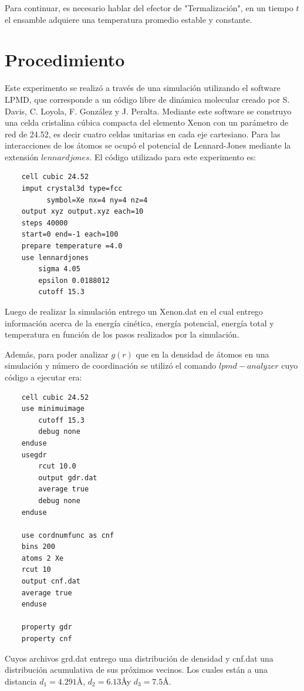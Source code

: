 \documentclass[10pt,letterpaper,twocolumn]{article}
\begin{document}
Para continuar, es necesario hablar del efector de "Termalización", en un tiempo $t$ el ensamble 
adquiere una temperatura promedio estable y constante.

\section*{Procedimiento}

Este experimento se  realizó a través de una simulación utilizando el software LPMD, 
que corresponde a un código libre de dinámica molecular creado por S. Davis, C. Loyola, F. González 
y J. Peralta. Mediante este software se construyo una celda cristalina cúbica compacta del elemento 
Xenon con un parámetro de red de 24.52, es decir cuatro celdas unitarias en cada eje cartesiano. 
Para las interacciones de los átomos se ocupó el potencial de Lennard-Jones mediante la 
extensión $lennardjones$.
El código utilizado para este experimento es:

\begin{lstlisting}
    cell cubic 24.52
    imput crystal3d type=fcc 
          symbol=Xe nx=4 ny=4 nz=4
    output xyz output.xyz each=10
    steps 40000
    start=0 end=-1 each=100 
    prepare temperature =4.0
    use lennardjones
        sigma 4.05
        epsilon 0.0188012
        cutoff 15.3
\end{lstlisting}

Luego de realizar la simulación entrego un Xenon.dat en el cual entrego información 
acerca de la energía cinética, energía potencial, energía total y temperatura en
 función de los pasos realizados por la simulación. 

Además, para poder analizar $g(r)$ que en la densidad de átomos en una simulación y número de 
coordinación se utilizó el comando $lpmd-analyzer$ cuyo código a ejecutar era:

\begin{lstlisting}
    cell cubic 24.52
    use minimuimage
        cutoff 15.3
        debug none
    enduse
    usegdr
        rcut 10.0
        output gdr.dat
        average true
        debug none
    enduse
    
    use cordnumfunc as cnf
    bins 200
    atoms 2 Xe
    rcut 10
    output cnf.dat
    average true
    enduse

    property gdr
    property cnf
\end{lstlisting}
 
Cuyos archivos grd.dat entrego una distribución de densidad y cnf.dat una distribución 
acumulativa de sus próximos vecinos. Los cuales están a una 
distancia $d_{1}=4.291$\AA , $d_{2}=6.13$\AA y $d_{3}=7.5$\AA.
\end{document}
